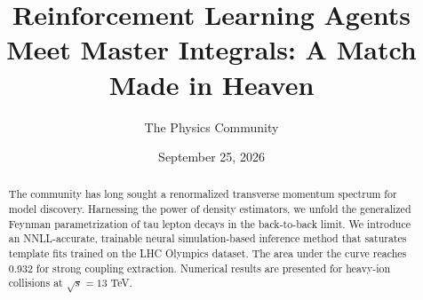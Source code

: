 \documentclass[11pt]{article}
\title{Reinforcement Learning Agents Meet Master Integrals: A Match Made in Heaven}
\author{The Physics Community}
\date{September 25, 2026}
\numberwithin{equation}{section}
\theoremstyle{definition}
\theoremstyle{remark}
\begin{document}
\maketitle
\begin{abstract}
The community has long sought a renormalized transverse momentum
spectrum for model discovery. Harnessing the power of density
estimators, we unfold the generalized Feynman parametrization of tau
lepton decays in the back-to-back limit. We introduce an NNLL-accurate,
trainable neural simulation-based inference method that saturates
template fits trained on the LHC Olympics dataset. The area under the
curve reaches 0.932 for strong coupling extraction. Numerical results
are presented for heavy-ion collisions at $\sqrt{s} = 13$ TeV.
\end{abstract}
\tableofcontents




\nocite{*}


\end{document}
